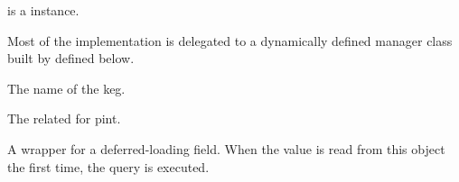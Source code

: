 \documentclass[letterpaper,10pt,english]{sphinxmanual}
\begin{document}
\begin{fulllineitems}
\begin{fulllineitems}
 is a  instance.

Most of the implementation is delegated to a dynamically defined manager
class built by  defined below.

\end{fulllineitems}


\begin{fulllineitems}
\label{\detokenize{modules/models:gestion.models.Keg.name}}
The name of the keg.

\end{fulllineitems}


\begin{fulllineitems}
\label{\detokenize{modules/models:gestion.models.Keg.objects}}
\end{fulllineitems}


\begin{fulllineitems}
\label{\detokenize{modules/models:gestion.models.Keg.pinte}}
The related {\hyperref[\detokenize{modules/models:gestion.models.Product}]{}} for pint.

\end{fulllineitems}


\begin{fulllineitems}
\label{\detokenize{modules/models:gestion.models.Keg.pinte_id}}
A wrapper for a deferred-loading field. When the value is read from this
object the first time, the query is executed.


\end{fulllineitems}
\end{fulllineitems}
\end{document}
